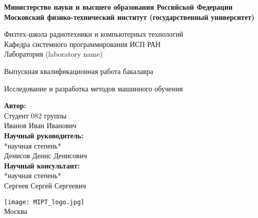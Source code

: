 \begin{center}
    \large\textbf{Министерство науки и высшего образования Российской Федерации\\
    Московский физико-технический институт (государственный
    университет)} \\
    \vspace{1cm}

    Физтех-школа радиотехники и компьютерных технологий \\

    Кафедра системного программирования ИСП РАН \\
    Лаборатория (laboratory name)\\

    \vspace{3em}

    Выпускная квалификационная работа бакалавра
\end{center}

\begin{center}
    \vspace{\fill}
    \LARGE{Исследование и разработка методов машинного обучения}

    \vspace{\fill}
\end{center}


\begin{flushright}
    \textbf{Автор:} \\
    Студент 082 группы \\
    Иванов Иван Иванович \\
    \vspace{2em}
    \textbf{Научный руководитель:} \\
    *научная степень* \\
    Денисов Денис Денисович \\
    \vspace{2em}
    \textbf{Научный консультант:} \\
    *научная степень* \\
    Сергеев Сергей Сергеевич \\
\end{flushright}

\vspace{7em}

\begin{center}
    \texttt{[image: MIPT\_logo.jpg]}\\
    Москва \the\year{}
\end{center}

\thispagestyle{empty}

\newpage
\setcounter{page}{2}
\fancyfoot[c]{\thepage}
\fancyhead[R]{}
